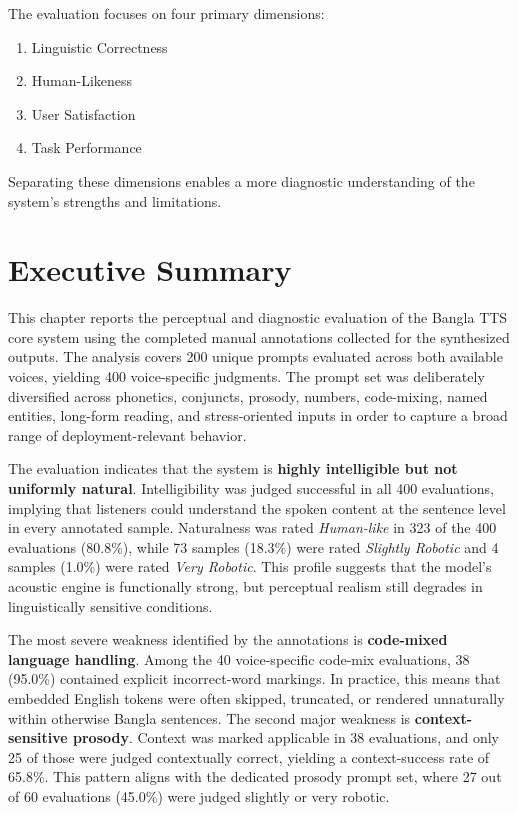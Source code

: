 The evaluation focuses on four primary dimensions:

\begin{enumerate}
\item Linguistic Correctness
\item Human-Likeness
\item User Satisfaction
\item Task Performance
\end{enumerate}

Separating these dimensions enables a more diagnostic understanding of the system's strengths and limitations.

\section{Executive Summary}

This chapter reports the perceptual and diagnostic evaluation of the Bangla TTS core system using the completed manual annotations collected for the synthesized outputs. The analysis covers 200 unique prompts evaluated across both available voices, yielding 400 voice-specific judgments. The prompt set was deliberately diversified across phonetics, conjuncts, prosody, numbers, code-mixing, named entities, long-form reading, and stress-oriented inputs in order to capture a broad range of deployment-relevant behavior.

The evaluation indicates that the system is \textbf{highly intelligible but not uniformly natural}. Intelligibility was judged successful in all 400 evaluations, implying that listeners could understand the spoken content at the sentence level in every annotated sample. Naturalness was rated \textit{Human-like} in 323 of the 400 evaluations (80.8\%), while 73 samples (18.3\%) were rated \textit{Slightly Robotic} and 4 samples (1.0\%) were rated \textit{Very Robotic}. This profile suggests that the model's acoustic engine is functionally strong, but perceptual realism still degrades in linguistically sensitive conditions.

The most severe weakness identified by the annotations is \textbf{code-mixed language handling}. Among the 40 voice-specific code-mix evaluations, 38 (95.0\%) contained explicit incorrect-word markings. In practice, this means that embedded English tokens were often skipped, truncated, or rendered unnaturally within otherwise Bangla sentences. The second major weakness is \textbf{context-sensitive prosody}. Context was marked applicable in 38 evaluations, and only 25 of those were judged contextually correct, yielding a context-success rate of 65.8\%. This pattern aligns with the dedicated prosody prompt set, where 27 out of 60 evaluations (45.0\%) were judged slightly or very robotic.

